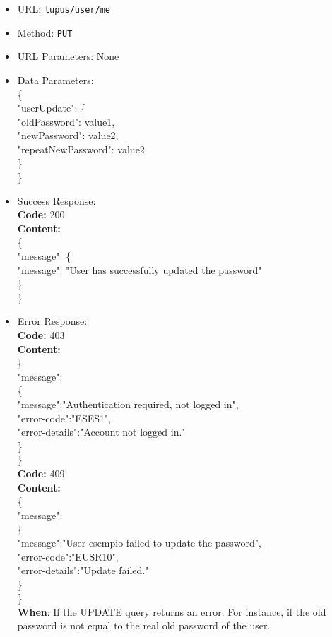 \begin{itemize}
    \item URL: \texttt{lupus/user/me}
    \item Method: \texttt{PUT}
    \item URL Parameters: None
    \item Data Parameters:\\
        \{\\
        \tab "userUpdate": \{ \\
        \tab \tab "oldPassword": value1, \\
        \tab \tab "newPassword": value2, \\
        \tab \tab "repeatNewPassword": value2 \\
        \tab \}\\
        \}\\
    \item Success Response: \\
        \textbf{Code:} 200\\
        \textbf{Content:} \\
        \{\\
        \tab  "message": \{ \\
        \tab \tab "message": "User has successfully updated the password" \\
        \tab\}\\
        \} \\
    \item Error Response:\\
        \textbf{Code:} 403\\
        \textbf{Content:}\\
        \{\\
         \tab "message":\\
         \tab \{\\
         \tab \tab "message":"Authentication required, not logged in",\\
         \tab \tab "error-code":"ESES1",\\
         \tab \tab "error-details":"Account not logged in."\\
         \tab \}\\
        \}\\

        
        \textbf{Code:} 409\\
        \textbf{Content:}\\
        \{\\
         \tab "message":\\
         \tab \{\\
         \tab \tab "message":"User esempio failed to update the password",\\
         \tab \tab "error-code":"EUSR10",\\
         \tab \tab "error-details":"Update failed."\\
         \tab \}\\
        \}\\
        \textbf{When}: If the UPDATE query returns an error. For instance, if the old password is not equal to the real old password of the user.\\


\end{itemize}

